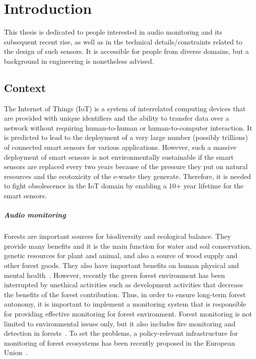 \documentclass{EPL-master-thesis-covers-EN}
\begin{document}
\tableofcontents

\listoffigures

\listoftables

\newpage

\hypersetup{pageanchor=true}


\chapter{Introduction}

This thesis is dedicated to people interested in audio monitoring and its subsequent recent rise, as well as in the technical details/constraints related to the design of such sensors. It is accessible for people from diverse domains, but a background in engineering is nonetheless advised.

\section*{Context}

The Internet of Things (IoT) is a system of interrelated computing devices that are provided with unique identifiers and the ability to transfer data over a network without requiring human-to-human or human-to-computer interaction. It is predicted to lead to the deployment of a very large number (possibly trillions) of connected smart sensors for various applications. However, such a massive deployment of smart sensors is not environmentally sustainable if the smart sensors are replaced every two years because of the pressure they put on natural resources and the ecotoxicity of the e-waste they generate. Therefore, it is needed to fight obsolescence in the IoT domain by enabling a 10+ year lifetime for the smart sensors. 

\paragraph{Audio monitoring}

Forests are important sources for biodiversity and ecological balance. They provide many benefits and it is the main function for water and soil conservation, genetic resources for plant and animal, and also a source of wood supply and other forest goods. They also have important benefits on human physical and mental health~\cite{Meyer-Schulz}. However, recently the green forest environment has been interrupted by unethical activities such as development activities that decrease the benefits of the forest contribution.
Thus, in order to ensure long-term forest autonomy, it is important to implement a monitoring system that is responsible for providing effective monitoring for forest environment. Forest monitoring is not limited to environmental issues only, but it also includes fire monitoring and detection in forests~\cite{OTHMAN20121204}. To set the problems, a policy-relevant infrastructure for monitoring of forest ecosystems has been recently proposed in the European Union~\cite{ICP_Forests}.
\end{document}
